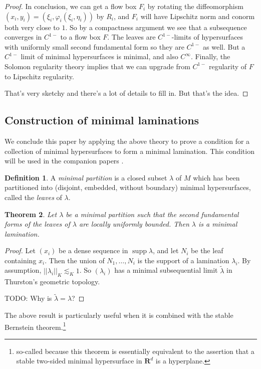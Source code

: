 \documentclass[reqno,10pt]{amsart}
\newcommand{\RR}{\mathbf{R}}
\DeclareMathOperator{\supp}{supp}
\newcommand{\dfn}[1]{\emph{#1}\index{#1}}
\newtheorem{theorem}{Theorem}[section]
\theoremstyle{definition}
\newtheorem{definition}[theorem]{Definition}
\numberwithin{equation}{section}
\begin{document}
\begin{proof}
In conclusion, we can get a flow box $F_i$ by rotating the diffeomorphism $(x_i, y_i) = (\xi_i, \varphi_i(\xi_i, \eta_i))$ by $R_i$, and $F_i$ will have Lipschitz norm and conorm both very close to $1$.
So by a compactness argument we see that a subsequence converges in $C^{1-}$ to a flow box $F$.
The leaves are $C^{1-}$-limits of hypersurfaces with uniformly small second fundamental form so they are $C^{1-}$ as well.
But a $C^{1-}$ limit of minimal hypersurfaces is minimal, and also $C^\infty$.
Finally, the Solomon regularity theory implies that we can upgrade from $C^{1-}$ regularity of $F$ to Lipschitz regularity.

That's very sketchy and there's a lot of details to fill in. But that's the idea.
\end{proof}



\subsection{Construction of minimal laminations}
We conclude this paper by applying the above theory to prove a condition for a collection of minimal hypersurfaces to form a minimal lamination.
This condition will be used in the companion papers \cite{BackusFLG, DaskalopoulosPrep2}.

\begin{definition}
A \dfn{minimal partition} is a closed subset $\lambda$ of $M$ which has been partitioned into (disjoint, embedded, without boundary) minimal hypersurfaces, called the \dfn{leaves} of $\lambda$.
\end{definition}

\begin{theorem}
Let $\lambda$ be a minimal partition such that the second fundamental forms of the leaves of $\lambda$ are locally uniformly bounded.
Then $\lambda$ is a minimal lamination.
\end{theorem}
\begin{proof}
Let $(x_i)$ be a dense sequence in $\supp \lambda$, and let $N_i$ be the leaf containing $x_i$.
Then the union of $N_1, \dots, N_i$ is the support of a lamination $\lambda_i$.
By assumption, $||\lambda_i||_K \lesssim_K 1$.
So $(\lambda_i)$ has a minimal subsequential limit $\tilde \lambda$ in Thurston's geometric topology.

TODO: Why is $\tilde \lambda = \lambda$?
\end{proof}

The above result is particularly useful when it is combined with the stable Bernstein theorem.\footnote{so-called because this theorem is essentially equivalent to the assertion that a stable two-sided minimal hypersurface in $\RR^d$ is a hyperplane.}
\end{document}
